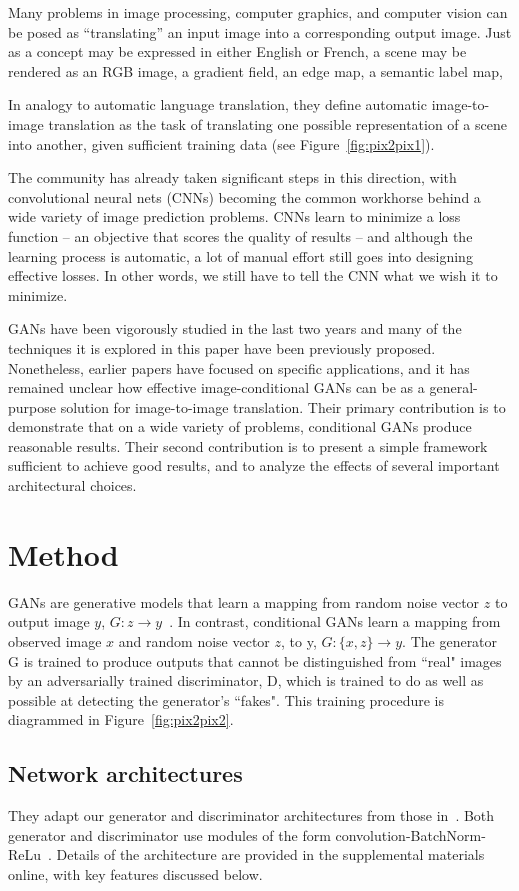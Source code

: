 \documentclass[10pt,twocolumn,letterpaper]{article}
\begin{document}
  Many problems in image processing, computer graphics, and computer vision can be posed as “translating” an input image into a corresponding output image. Just as a concept may be expressed in either English or French, a scene may be rendered as an RGB image, a gradient field, an edge map, a semantic label map, \par
  In analogy to automatic language translation, they define automatic image-to-image translation as the task of translating one possible representation of a scene into another, given sufficient training data (see Figure~\ref{fig:pix2pix1}).\par
  The community has already taken significant steps in this direction, with convolutional neural nets (CNNs) becoming
  the common workhorse behind a wide variety of image prediction problems. CNNs learn to minimize a loss function – an objective that scores the quality of results – and although the learning process is automatic, a lot of manual effort still goes into designing effective losses. In other words, we still have to tell the CNN what we wish it to minimize.\par
  GANs have been vigorously studied in the last two years and many of the techniques it is explored in this paper have been previously proposed. Nonetheless, earlier papers have focused on specific applications, and it has remained unclear how effective image-conditional GANs can be as a general-purpose solution for image-to-image translation. Their primary contribution is to demonstrate that on a wide variety of problems, conditional GANs produce reasonable results. Their second contribution is to present a simple framework sufficient to achieve good results, and to analyze the effects of several important architectural choices.\par
  
  \section{Method}
  GANs are generative models that learn a mapping from random noise vector $z$ to output image $y$, $G : z \rightarrow y$~\cite{Goodfellow2014Generative}. In contrast, conditional GANs learn a mapping from observed image $x$ and random noise vector $z$, to y, $G : \{x, z\} \rightarrow y$. The generator G is trained to produce outputs that cannot be distinguished from ``real" images by an adversarially trained discriminator, D, which is trained to do as well as possible at detecting the generator’s ``fakes". This training procedure is diagrammed in Figure~\ref{fig:pix2pix2}.
  \subsection{Network architectures}
  They adapt our generator and discriminator architectures from those in~\cite{Radford2016Unsupervised}. Both generator and discriminator use modules of the form convolution-BatchNorm-ReLu~\cite{Ioffe2015Batch}. Details of the architecture are provided in the supplemental materials online, with key features discussed below.


{\small


}
\end{document}
